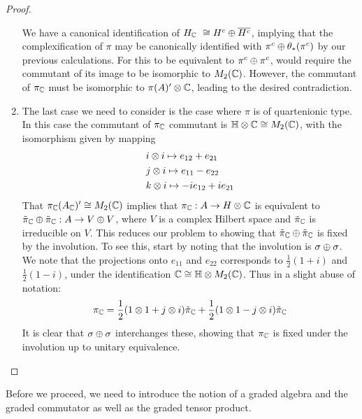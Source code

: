 \begin{proof}
\begin{enumerate}
	We have a canonical identification of $H_{\mathbb{C}}\ \cong H^c \oplus \overline{H^c}$, implying that the complexification of $\pi$ may be canonically identified with $\pi^c\oplus \theta_*(\pi^c)$ by our previous calculations. For this to be equivalent to $\pi^c\oplus \pi^c$, would require the commutant of its image to be isomorphic to $M_2(\mathbb{C})$. However, the commutant of $\pi_{\mathbb{C}}$ must be isomorphic to $\pi(A)'\otimes \mathbb{C}$, leading to the desired contradiction. 
\item 
	The last case we need to consider is the case where $\pi$ is of quartenionic type. In this case the commutant of $\pi_{\mathbb{C}}$ commutant is $\mathbb{H}\otimes \mathbb{C}\cong M_2(\mathbb{C})$, with the isomorphism given by mapping 
	\begin{align*}
	&i\otimes i \mapsto e_{12}+e_{21} \\
	&j\otimes i \mapsto e_{11}-e_{22} \\
	&k\otimes i \mapsto -ie_{12} +ie_{21} 
	\end{align*}
	That $\pi_{\mathbb{C}}(A_{\mathbb{C}})'\cong M_2(\mathbb{C})$ implies that $\pi_{\mathbb{C}}: A\to H\otimes \mathbb{C}$ is equivalent to $\tilde{\pi}_{\mathbb{C}}\oplus \tilde{\pi}_{\mathbb{C}} :A\to V \oplus V$, where $V$ is a complex Hilbert space and $\tilde{\pi}_{\mathbb{C}}$ is irreducible on $V$. %
	This reduces our problem to showing that $\tilde{\pi}_{\mathbb{C}} \oplus \tilde{\pi}_{\mathbb{C}}$ is fixed by the involution. To see this, start by noting that the involution is $\sigma \oplus \sigma$. We note that the projections onto $e_{11}$ and $e_{22}$ corresponds to $\frac{1}{2}(1+i)$ and $\frac{1}{2}(1-i)$, under the identification $\mathbb{C}\cong \mathbb{H} \otimes M_2(\mathbb{C})$. Thus in a slight abuse of notation:
	\begin{align*}
		\pi_{\mathbb{C}}=\frac{1}{2}(1\otimes 1+j\otimes i)\tilde{\pi}_{\mathbb{C}}+\frac{1}{2}(1\otimes 1-j\otimes i)\tilde{\pi}_{\mathbb{C}}
	\end{align*}
	It is clear that $\sigma\oplus \sigma$ interchanges these, showing that $\pi_{\mathbb{C}}$ is fixed under the involution up to unitary equivalence. 
	\end{enumerate}  
\end{proof}
Before we proceed, we need to introduce the notion of a graded \Cstar algebra and the graded commutator as well as the graded tensor product. 
